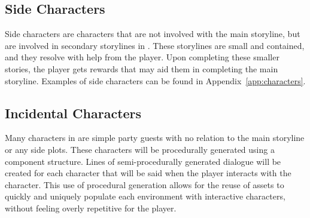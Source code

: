 \subsection{Side Characters}
Side characters are characters that are not involved with the main storyline, but are involved in secondary storylines in \ourgame{}. These storylines are small and contained, and they resolve with help from the player. Upon completing these smaller stories, the player gets rewards that may aid them in completing the main storyline. Examples of side characters can be found in Appendix~\ref{app:characters}.

\subsection{Incidental Characters}
Many characters in \ourgame{} are simple party guests with no relation to the main storyline or any side plots. These characters will be procedurally generated using a component structure. Lines of semi-procedurally generated dialogue will be created for each character that will be said when the player interacts with the character. This use of procedural generation allows for the reuse of assets to quickly and uniquely populate each environment with interactive characters, without feeling overly repetitive for the player.
